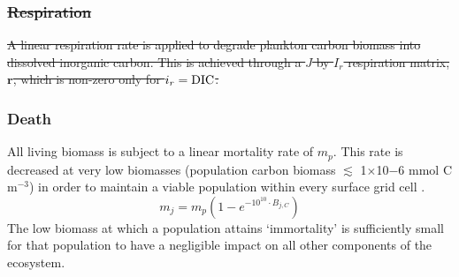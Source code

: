 \documentclass[gmd, manuscript]{copernicus}
\newcommand{\matr}[1]{\mathbf{#1}}
\providecommand{\DIFdel}[1]{{\protect\color{red}\sout{#1}}}                      %
\providecommand{\DIFdelbegin}{} %
\providecommand{\DIFdelend}{} %
\begin{document}
\DIFdelbegin \subsubsection{\DIFdel{Respiration}}
\addtocounter{subsubsection}{-1}%
\DIFdelend %

\DIFdelbegin \DIFdel{A linear respiration rate is applied to degrade plankton carbon biomass into dissolved inorganic carbon. This is achieved through a $J$ by $I_r$ respiration matrix, $\matr{r}$, which is non-zero only for $i_r={\rm DIC}$.
}\DIFdelend %


\subsubsection{Death}

All living biomass is subject to a linear mortality rate of $m_p$. This rate is decreased at very low biomasses (population carbon biomass $\lesssim$ 1$\times$10${-6}$ mmol C m$^{-3}$) in order to maintain a viable population within every surface grid cell \citep[``everything is everywhere, but the environment selects'',][]{BaasBecking:1934}. 
%
\begin{equation}
m_j = m_p (1-e^{-10^{10}\cdot B_{j,C}})
\end{equation}
%
The low biomass at which a population attains `immortality' is sufficiently small for that population to have a negligible impact on all other components of the ecosystem.










\end{document}
